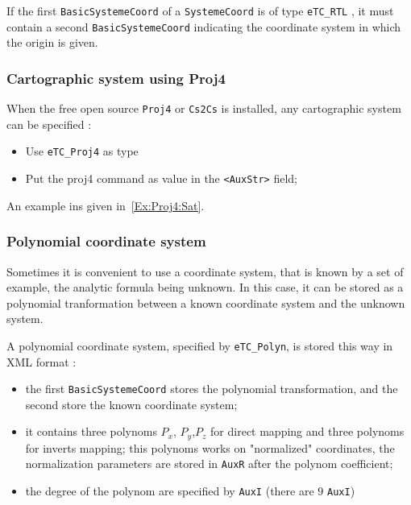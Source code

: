If the first {\tt BasicSystemeCoord} of a {\tt SystemeCoord} is of type {\tt eTC\_RTL} ,
it must contain a second {\tt BasicSystemeCoord} indicating the coordinate system
in which the origin is given.


\subsubsection{Cartographic system using Proj4}

When the free open source {\tt Proj4} or {\tt Cs2Cs} is installed, any cartographic
system can be specified :

\begin{itemize}
   \item Use {\tt eTC\_Proj4} as type
   \item  Put the proj4 command as value in the {\tt <AuxStr>} field;
\end{itemize}

An example ins given in~\ref{Ex:Proj4:Sat}.




\subsubsection{Polynomial coordinate system}

Sometimes it is convenient to use a coordinate system, that is known by a set
of example, the analytic formula being unknown. In this case, it can be stored
as a polynomial tranformation between a known coordinate system and the unknown
system.

A polynomial coordinate system, specified by {\tt eTC\_Polyn},
 is stored this way in XML format :

\begin{itemize}
   \item  the first {\tt BasicSystemeCoord} stores the polynomial transformation, and the
          second store the known coordinate system;

   \item  it contains three polynoms $P_x$, $P_y$,$P_z$ for direct mapping
          and three polynoms for inverts mapping; this polynoms works on "normalized"
          coordinates,  the normalization parameters are stored in {\tt AuxR}
          after the polynom coefficient;

   \item  the degree of the polynom are specified by {\tt AuxI} (there are $9$ {\tt AuxI})

\end{itemize}

